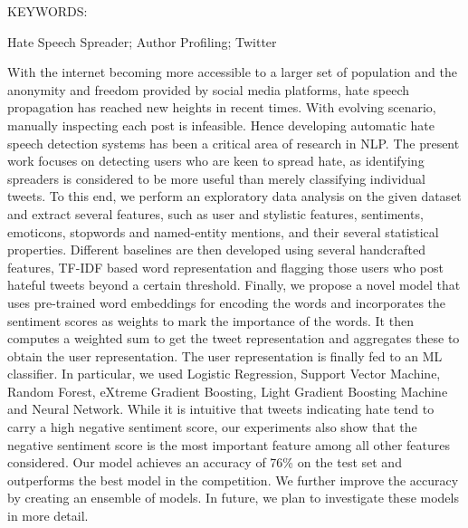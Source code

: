 \documentclass[BTech]{iitddiss}
\begin{document}
\noindent KEYWORDS: \hspace*{0.5em} \parbox[t]{4.4in}{Hate Speech Spreader; Author Profiling; Twitter}

\vspace*{24pt}


\noindent
With the internet becoming more accessible to a larger set of population and the anonymity and freedom provided by social media platforms, hate speech propagation has reached new heights in recent times. With evolving scenario, manually inspecting each post is infeasible. Hence developing automatic hate speech detection systems has been a critical area of research in NLP. The present work focuses on detecting users who are keen to spread hate, as identifying spreaders is considered to be more useful than merely classifying individual tweets. To this end, we perform an exploratory data analysis on the given dataset and extract several features, such as user and stylistic features, sentiments, emoticons, stopwords and named-entity mentions, and their several statistical properties. Different baselines are then developed using several handcrafted features, TF-IDF based word representation and flagging those users who post hateful tweets beyond a certain threshold. Finally, we propose a novel model that uses pre-trained word embeddings for encoding the words and incorporates the sentiment scores as weights to mark the importance of the words. It then computes a weighted sum to get the tweet representation and aggregates these to obtain the user representation. The user representation is finally fed to an ML classifier. In particular, we used Logistic Regression, Support Vector Machine, Random Forest, eXtreme Gradient Boosting, Light Gradient Boosting Machine and Neural Network. While it is intuitive that tweets indicating hate tend to carry a high negative sentiment score, our experiments also show that the negative sentiment score is the most important feature among all other features considered. Our model achieves an accuracy of 76\% on the test set and outperforms the best model in the competition. We further improve the accuracy by creating an ensemble of models. In future, we plan to investigate these models in more detail.
\end{document}
